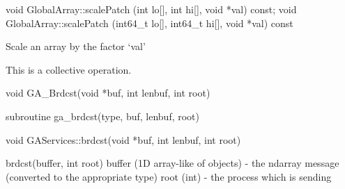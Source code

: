 \documentclass[12pt]{article}
\begin{document}
\begin{cxxapi}
\begin{cxxcode}
void GlobalArray::scalePatch (int lo[], int hi[], void *val) const;
void GlobalArray::scalePatch (int64_t lo[], int64_t hi[], void *val) const
\end{cxxcode}
\begin{funcargs}
\end{funcargs}
\end{cxxapi}
\gcoll

\begin{desc}

Scale an array by the factor `val'

This is a collective operation.
\end{desc}


\begin{capi}
\begin{ccode}
void GA_Brdcst(void *buf, int lenbuf, int root)
\end{ccode}
\begin{funcargs}
\end{funcargs}
\end{capi}

\begin{fapi}
\begin{fcode}
subroutine ga_brdcst(type, buf, lenbuf, root)
\end{fcode}
\begin{funcargs}
\end{funcargs}
\end{fapi}

\begin{cxxapi}
\begin{cxxcode}
void GAServices::brdcst(void *buf, int lenbuf, int root)
\end{cxxcode}
\begin{funcargs}
\end{funcargs}
\end{cxxapi}

\begin{pyapi}
\begin{pycode}
brdcst(buffer, int root)
   buffer (1D array-like of objects) - the ndarray message
                                       (converted to the appropriate type)
   root (int)                        - the process which is sending
\end{pycode}
\end{pyapi}
\end{document}
